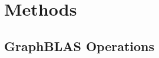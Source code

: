 \documentclass[11pt]{extarticle}
\begin{document}




\section{Methods}
\label{Sec:Methods}





\subsection{GraphBLAS Operations}









\appendix


%
%
\end{document}
